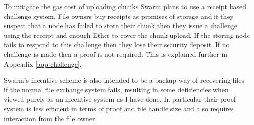 \documentclass[12pt,a4paper,twoside,openright]{report}
\begin{document}
To mitigate the gas cost of uploading chunks Swarm plans to use a receipt based challenge system.
File owners buy receipts as promises of storage and if they suspect that a node has failed to store their chunk then they issue
a challenge using the receipt and enough Ether to cover the chunk upload.
If the storing node fails to respond to this challenge then they lose their security deposit.
If no challenge is made then a proof is not required. This is explained further in Appendix \ref{app-challenge}.

Swarm's incentive scheme is also intended to be a backup way of recovering files if the normal file exchange system fails,
resulting in some deficiencies when viewed purely as an incentive system as I have done.
In particular their proof system is less efficient in terms of proof and file handle size and also requires interaction from the file owner.
\end{document}
